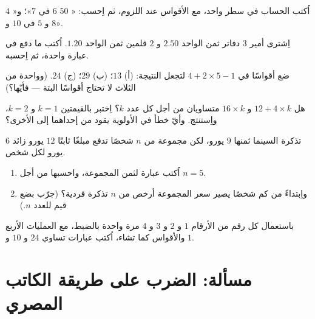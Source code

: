 \begin{exercise}[$\star$]\label{exo:g7:priorities:6}
اُكتب الحساب في سطر واحد، مع الأقواس عند اللزوم، ثم
اِحسب: « $50$  $6$ في $7$»؛
و«  $4$ و $5$ في  $10$ و
$8$».
\end{exercise}

\begin{exercise}[$\star$]\label{exo:g7:priorities:7}
اِشترى أمير $3$ دفاتر ثمن الواحد $2.50$ و $2$ قلمين ثمن الواحد $1.20$.
اُكتب  ما دفع في عبارة واحدة، ثم اِحسبه.
\end{exercise}

\begin{exercise}[$\star\star$]\label{exo:g7:priorities:8}
ضع أقواسًا في $4 + 2 \times 5 - 1$ لتجعل النتيجة: (أ) $13$؛
(ب) $29$؛ (ج) $24$. (وواحدة من الثلاث لا تحتاج أقواسًا البتة ---
فأيّها؟)
\end{exercise}

\begin{exercise}[$\star\star$]\label{exo:g7:priorities:9}
هل $12 + 4 \times k$ و $16 \times k$ متساويان من أجل كل عدد $k$؟
اِختبر بالقيمتين $k = 1$ و $k = 2$، واِستنتج. وأيّ خطأ في الأولوية
يقود من إحداهما إلى الأخرى؟
\end{exercise}

\begin{exercise}[$\star\star$]\label{exo:g7:priorities:10}
تذكرة السينما ثمنها $9$ يورو، لكن مجموعة من $n$ شخصًا تدفع مبلغًا
ثابتًا $12$ يورو زائد $6$ يورو لكل شخص.
\begin{enumerate}
  \item اُكتب عبارة لثمن المجموعة، واحسبها من أجل
        $n = 5$.
  \item واِبتداءً من كم شخصًا يصير سعر المجموعة أرخص من $n$
        تذكرة فردية؟ (جرّب بضع قيم للعدد $n$.)
\end{enumerate}
\end{exercise}

\begin{exercise}[$\star\star\star$]\label{exo:g7:priorities:11}
باستعمال كل رقم من الأرقام $1$ و $2$ و $3$ و $4$ مرة واحدة بالضبط، مع
العمليات الأربع والأقواس كما تشاء، اُكتب عبارات تساوي $24$ و
$10$ و $1$.
\end{exercise}

\section{مسألة: الضرب على طريقة الكاتب المصري}

